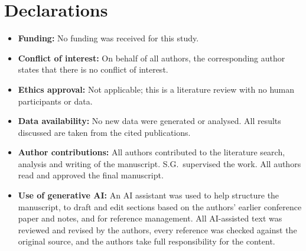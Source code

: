 \documentclass[pdflatex,sn-mathphys-num]{sn-jnl}%
\begin{document}
\backmatter

\section*{Declarations}

\begin{itemize}
\item \textbf{Funding:} No funding was received for this study.
\item \textbf{Conflict of interest:} On behalf of all authors, the corresponding author states that there is no conflict of interest.
\item \textbf{Ethics approval:} Not applicable; this is a literature review with no human participants or data.
\item \textbf{Data availability:} No new data were generated or analysed. All results discussed are taken from the cited publications.
\item \textbf{Author contributions:} All authors contributed to the literature search, analysis and writing of the manuscript. S.G.\ supervised the work. All authors read and approved the final manuscript.
\item \textbf{Use of generative AI:} An AI assistant was used to help structure the manuscript, to draft and edit sections based on the authors' earlier conference paper and notes, and for reference management. All AI-assisted text was reviewed and revised by the authors, every reference was checked against the original source, and the authors take full responsibility for the content.
\end{itemize}


\end{document}
